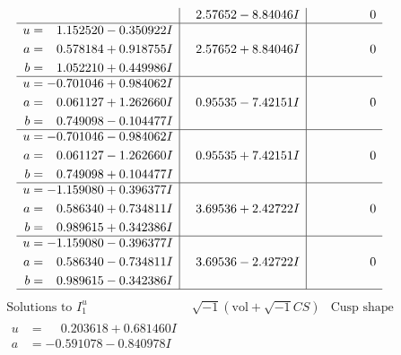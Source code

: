 \documentclass[1p]{elsarticle_modified}
\theoremstyle{definition}
\newcommand{\I}{\sqrt{-1}}
\begin{document}
$$\begin{array}{c|c|c}
 & \phantom{-}2.57652 - 8.84046 I & \phantom{-0.000000 } 0 \\ \hline\begin{aligned}
u &= \phantom{-}1.152520 - 0.350922 I \\
a &= \phantom{-}0.578184 + 0.918755 I \\
b &= \phantom{-}1.052210 + 0.449986 I\end{aligned}
 & \phantom{-}2.57652 + 8.84046 I & \phantom{-0.000000 } 0 \\ \hline\begin{aligned}
u &= -0.701046 + 0.984062 I \\
a &= \phantom{-}0.061127 + 1.262660 I \\
b &= \phantom{-}0.749098 - 0.104477 I\end{aligned}
 & \phantom{-}0.95535 - 7.42151 I & \phantom{-0.000000 } 0 \\ \hline\begin{aligned}
u &= -0.701046 - 0.984062 I \\
a &= \phantom{-}0.061127 - 1.262660 I \\
b &= \phantom{-}0.749098 + 0.104477 I\end{aligned}
 & \phantom{-}0.95535 + 7.42151 I & \phantom{-0.000000 } 0 \\ \hline\begin{aligned}
u &= -1.159080 + 0.396377 I \\
a &= \phantom{-}0.586340 + 0.734811 I \\
b &= \phantom{-}0.989615 + 0.342386 I\end{aligned}
 & \phantom{-}3.69536 + 2.42722 I & \phantom{-0.000000 } 0 \\ \hline\begin{aligned}
u &= -1.159080 - 0.396377 I \\
a &= \phantom{-}0.586340 - 0.734811 I \\
b &= \phantom{-}0.989615 - 0.342386 I\end{aligned}
 & \phantom{-}3.69536 - 2.42722 I & \phantom{-0.000000 } 0\\
 \hline 
 \end{array}$$\newpage$$\begin{array}{c|c|c}  
\text{Solutions to }I^u_{1}& \I (\text{vol} + \sqrt{-1}CS) & \text{Cusp shape}\\
 \hline 
\begin{aligned}
u &= \phantom{-}0.203618 + 0.681460 I \\
a &= -0.591078 - 0.840978 I \\

\end{aligned}
\end{array}$$
\end{document}

